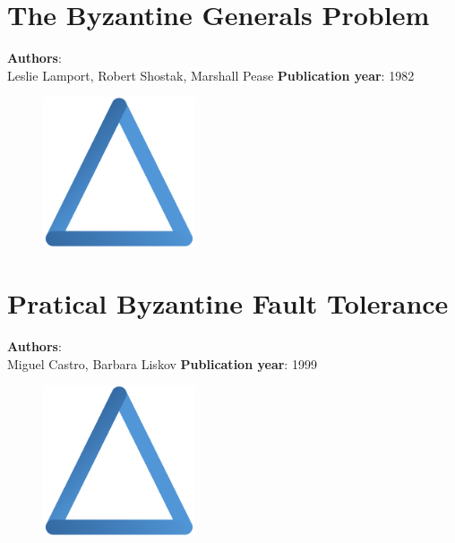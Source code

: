 \documentclass[11pt,fleqn]{book} %
\begin{document}
\chapter{The Byzantine Generals Problem}
\vspace*{-7mm}
\Large \textbf{Authors}: \\
Leslie Lamport, Robert Shostak, Marshall Pease
\newline\newline
\textbf{Publication year}: 1982
\begin{figure}[b]
    \centering
    \includegraphics[width=0.4\textwidth]{distributed-systems-triangle-blue.pdf}
\end{figure}


\chapter{Pratical Byzantine Fault Tolerance}
\vspace*{-7mm}
\Large \textbf{Authors}: \\
Miguel Castro, Barbara Liskov
\newline\newline
\textbf{Publication year}: 1999
\begin{figure}[b]
    \centering
    \includegraphics[width=0.4\textwidth]{distributed-systems-triangle-blue.pdf}
\end{figure}

\end{document}
